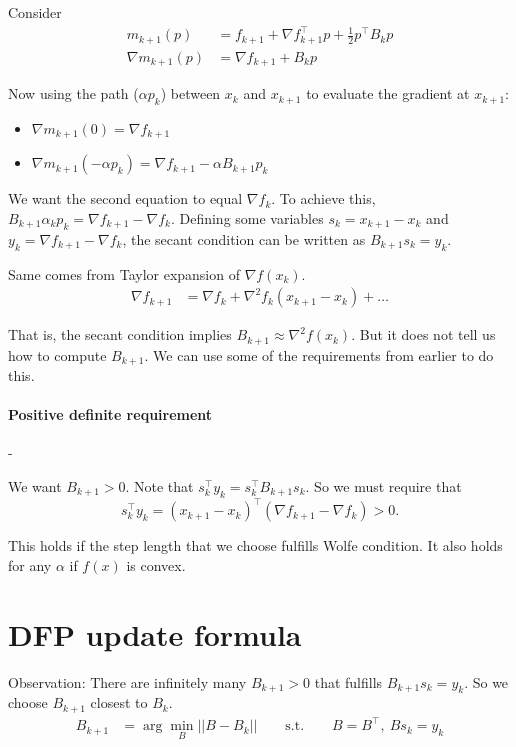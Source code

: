 \documentclass{article}
\begin{document}
\medskip Consider 
\begin{align*}
  m_{k+1}(p) &= f_{k+1} + \nabla f_{k+1}^{\top}p + \frac{1}{2} p^{\top} B_k p \\ 
  \nabla m_{k+1}(p) &= \nabla f_{k+1} + B_k p   
\end{align*}

Now using the path ($\alpha p_k$) between $x_k$ and $x_{k+1}$ to evaluate the gradient at $x_{k+1}$:
\begin{itemize}
  \item $\nabla m_{k+1}(0) = \nabla f_{k+1}$
  \item $\nabla m_{k+1}(-\alpha p_k) = \nabla f_{k+1} - \alpha B_{k+1} p_k$
\end{itemize}

We want the second equation to equal $\nabla f_k$. To achieve this, $B_{k+1} \alpha_k p_k = \nabla f_{k+1} - \nabla f_k$. Defining some variables $s_k = x_{k+1} - x_k$ and $y_k = \nabla f_{k+1} - \nabla f_k$, 
the secant condition can be written as $B_{k+1} s_k = y_k$. 

\medskip Same comes from Taylor expansion of $\nabla f(x_k)$. 
\begin{align*}
  \nabla f_{k+1} &= \nabla f_k + \nabla ^2 f_k (x_{k+1}- x_k) + \dots
\end{align*}

That is, the secant condition implies $B_{k+1} \approx \nabla ^2 f(x_k)$. But it does not tell us how to compute $B_{k+1}$. 
We can use some of the requirements from earlier to do this.

\paragraph{Positive definite requirement}- 

\medskip We want $B_{k+1} > 0$. Note that $s_k^{\top}y_k = s_k^{\top}B_{k+1}s_k$. So we must require that 
\[
  s_k^{\top}y_k = (x_{k+1} - x_k)^{\top}(\nabla f_{k+1} - \nabla f_k) > 0
.\] 

This holds if the step length that we choose fulfills Wolfe condition. It also holds for any $\alpha$ if $f(x) $ is convex. 

\section{DFP update formula}

Observation: There are infinitely many $B_{k+1} > 0$ that fulfills $B_{k+1}s_k = y_k$. So we choose $B_{k+1}$ closest to $B_k$. 
\begin{align*}
  B_{k+1} &= \arg \min_B ||B-B_k|| \qquad\text{s.t.}\qquad B = B^{\top} ,\ Bs_k = y_k
\end{align*}
\end{document}
